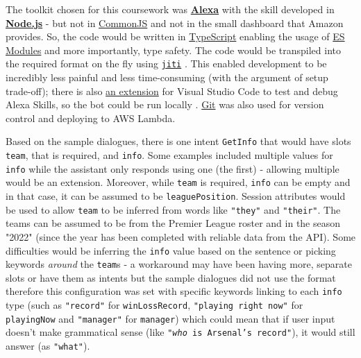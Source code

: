 \documentclass[10pt,a4paper,twocolumn]{article}
\begin{document}
The toolkit chosen for this coursework was \href{https://developer.amazon.com/en-GB/alexa}{\textbf{Alexa}} \cite{AmazonAl18:online} with the skill developed in \href{https://nodejs.dev/}{\textbf{Node.js}} \cite{RunJavaS19:online} - but not in \href{https://nodejs.org/docs/latest/api/modules.html}{CommonJS} \cite{ModulesC3:online} and not in the small dashboard that Amazon provides. So, the code would be written in \href{https://typescriptlang.org/}{TypeScript} \cite{TypeScri1:online} enabling the usage of \href{https://nodejs.org/docs/latest/api/esm.html}{ES Modules} \cite{ModulesE42:online} and more importantly, type safety. The code would be transpiled into the required format on the fly using \href{https://github.com/unjs/jiti}{\texttt{jiti}} \cite{GitHubun42:online}. This enabled development to be incredibly less painful and less time-consuming (with the argument of setup trade-off); there is also \href{https://marketplace.visualstudio.com/items?itemName=ask-toolkit.alexa-skills-kit-toolkit}{an extension} for Visual Studio Code to test and debug Alexa Skills, so the bot could be run locally \cite{AlexaSki43:online}. \href{https://git-scm.com/}{Git} \cite{Git14:online} was also used for version control and deploying to AWS Lambda.

Based on the sample dialogues, there is one intent \texttt{GetInfo} that would have slots \texttt{team}, that is required, and \texttt{info}. Some examples included multiple values for \texttt{info} while the assistant only responds using one (the first) - allowing multiple would be an extension. Moreover, while \texttt{team} is required, \texttt{info} can be empty and in that case, it can be assumed to be \texttt{leaguePosition}. Session attributes would be used to allow \texttt{team} to be inferred from words like \texttt{"they"} and \texttt{"their"}. The teams can be assumed to be from the Premier League roster and in the season "2022" (since the year has been completed with reliable data from the API). Some difficulties would be inferring the \texttt{info} value based on the sentence or picking keywords \textit{around} the \texttt{team}s - a workaround may have been having more, separate slots or have them as intents but the sample dialogues did not use the format therefore this configuration was set with specific keywords linking to each \texttt{info} type (such as \texttt{"record"} for \texttt{winLossRecord}, \texttt{"playing right now"} for \texttt{playingNow} and \texttt{"manager"} for \texttt{manager}) which could mean that if user input doesn't make grammatical sense (like \texttt{"\textit{who} is Arsenal's record"}), it would still answer (as \texttt{"what"}).
\end{document}
